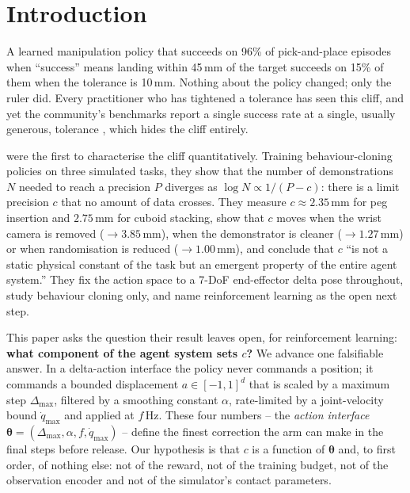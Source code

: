 \documentclass{article}
\newcommand{\dmax}{\Delta_{\max}}
\newcommand{\qdmax}{\dot q_{\max}}
\newcommand{\iface}{\boldsymbol{\theta}}
\begin{document}
\section{Introduction}
\label{sec:intro}

A learned manipulation policy that succeeds on 96\% of pick-and-place episodes when ``success'' means landing within 45\,mm of the target succeeds on 15\% of them when the tolerance is 10\,mm. Nothing about the policy changed; only the ruler did. Every practitioner who has tightened a tolerance has seen this cliff, and yet the community's benchmarks report a single success rate at a single, usually generous, tolerance \citep{jiang2026benchmarking}, which hides the cliff entirely.

\citet{xu2026curse} were the first to characterise the cliff quantitatively. Training behaviour-cloning policies on three simulated tasks, they show that the number of demonstrations $N$ needed to reach a precision $P$ diverges as $\log N \propto 1/(P - c)$: there is a limit precision $c$ that no amount of data crosses. They measure $c \approx 2.35$\,mm for peg insertion and $2.75$\,mm for cuboid stacking, show that $c$ moves when the wrist camera is removed ($\to 3.85$\,mm), when the demonstrator is cleaner ($\to 1.27$\,mm) or when randomisation is reduced ($\to 1.00$\,mm), and conclude that $c$ ``is not a static physical constant of the task but an emergent property of the entire agent system.'' They fix the action space to a 7-DoF end-effector delta pose throughout, study behaviour cloning only, and name reinforcement learning as the open next step.

This paper asks the question their result leaves open, for reinforcement learning: \textbf{what component of the agent system sets $c$?} We advance one falsifiable answer. In a delta-action interface the policy never commands a position; it commands a bounded displacement $a \in [-1,1]^d$ that is scaled by a maximum step $\dmax$, filtered by a smoothing constant $\alpha$, rate-limited by a joint-velocity bound $\qdmax$ and applied at $f$\,Hz. These four numbers -- the \emph{action interface} $\iface = (\dmax, \alpha, f, \qdmax)$ -- define the finest correction the arm can make in the final steps before release. Our hypothesis is that $c$ is a function of $\iface$ and, to first order, of nothing else: not of the reward, not of the training budget, not of the observation encoder and not of the simulator's contact parameters.
\end{document}
